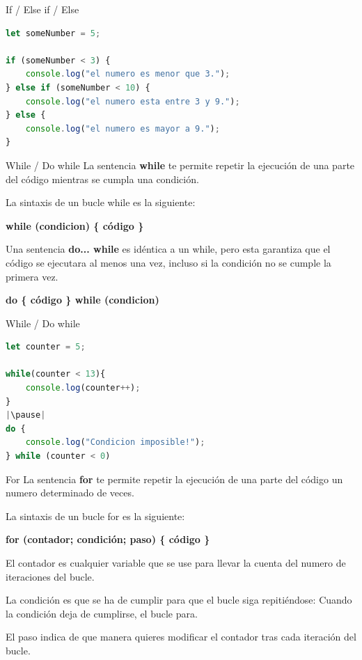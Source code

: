 \documentclass{beamer}
\begin{document}
\begin{frame}[fragile]{If / Else if / Else}
\begin{lstlisting}[language=JavaScript]
let someNumber = 5;

if (someNumber < 3) {
    console.log("el numero es menor que 3.");
} else if (someNumber < 10) {
    console.log("el numero esta entre 3 y 9.");
} else {
    console.log("el numero es mayor a 9.");
}
\end{lstlisting}
\end{frame}

\begin{frame}{While / Do while}
La sentencia \textbf{while} te permite repetir la ejecución de una parte del código mientras se cumpla una condición.\pause

La sintaxis de un bucle while es la siguiente:

\textbf{while (condicion) \{ código \} }\pause

Una sentencia \textbf{do... while} es idéntica a un while, pero esta garantiza que el código se ejecutara al menos una vez, incluso si la condición no se cumple la primera vez.

\textbf{do \{ código \} while (condicion) }

\end{frame}

\begin{frame}[fragile]{While / Do while}
\begin{lstlisting}[language=JavaScript]
let counter = 5;

while(counter < 13){
    console.log(counter++);
}
|\pause|
do {
    console.log("Condicion imposible!");
} while (counter < 0)   
\end{lstlisting}
\end{frame}

\begin{frame}{For}
La sentencia \textbf{for} te permite repetir la ejecución de una parte del código un numero determinado de veces.\pause

La sintaxis de un bucle for es la siguiente:

\textbf{for (contador; condición; paso) \{ código \} }\pause

El contador es cualquier variable que se use para llevar la cuenta del numero de iteraciones del bucle.

La condición es que se ha de cumplir para que el bucle siga repitiéndose: Cuando la condición deja de cumplirse, el bucle para.

El paso indica de que manera quieres modificar el contador tras cada iteración del bucle.
\end{frame}
\end{document}
